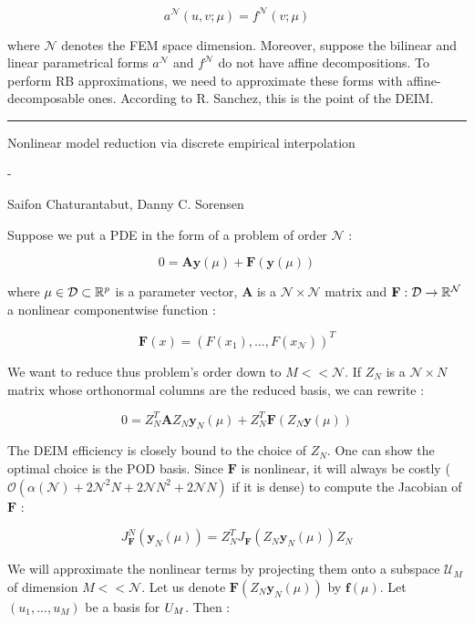 \documentclass[a4paper]{article}
\begin{document}
$$a^\mathcal N(u,v;\mu)=f^\mathcal N(v;\mu)$$

where $\mathcal N$ denotes the FEM space dimension. Moreover, suppose the bilinear and linear parametrical forms $a^\mathcal N$ and $f^\mathcal N$ do not have affine decompositions. To perform RB approximations, we need to approximate these forms with affine-decomposable ones. According to R. Sanchez, this is the point of the DEIM.


\bigskip

\begin{center}\rule{6cm}{0.2pt}\end{center}

\bigskip

%
\newcommand{\by}{\mathbf y}
\newcommand{\bu}{\mathbf u}
\newcommand{\bA}{\mathbf A}
\newcommand{\bU}{\mathbf U}
\newcommand{\bff}{\mathbf f}
\newcommand{\bF}{\mathbf F}
%


\begin{center}\Large\sc
Nonlinear model reduction via discrete empirical interpolation


\large-


Saifon Chaturantabut, Danny C. Sorensen
\end{center}

\bigskip

Suppose we put a PDE in the form of a problem of order $\mathcal N$ :

$$0=\bA\by(\mu)+\bF(\by(\mu))$$

where $\mu\in\mathcal D\subset\mathbb{R}^p$ is a parameter vector, $\bA$ is a $\mathcal N\times\mathcal N$ matrix and $\bF:\mathcal D\to\R^\mathcal N$ a nonlinear componentwise function :

$$\bF(x)=\left(F(x_1),...,F(x_\mathcal N)\right)^T$$

We want to reduce thus problem's order down to $M<<\mathcal N$. If $Z_N$ is a $\mathcal N\times N$ matrix whose orthonormal columns are the reduced basis, we can rewrite :

$$0 = Z_N^T\bA Z_N\by_N(\mu)+Z_N^T\bF(Z_N\by(\mu))$$

The DEIM efficiency is closely bound to the choice of $Z_N$. One can show the optimal choice is the POD basis.
Since $\bF$ is nonlinear, it will always be costly ($\mathcal O(\alpha(\mathcal N)+2\mathcal N^2N+2\mathcal NN^2+2\mathcal NN)$ if it is dense) to compute the Jacobian of $\bF$ :

$$J_\bF^N(\by_N(\mu))=Z_N^TJ_\bF(Z_N\by_N(\mu))Z_N$$

We will approximate the nonlinear terms by projecting them onto a subspace $\mathcal U_M$ of dimension $M<<\mathcal N$.
Let us denote $\bF(Z_N\by_N(\mu))$ by $\bff(\mu)$. Let $(u_1,...,u_M)$ be a basis for $\mathcal \bU_M$. Then :
\end{document}
